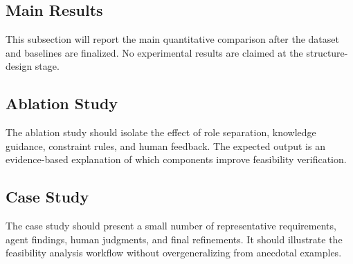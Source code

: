 \subsection{Main Results}
\label{exp:main_results}

This subsection will report the main quantitative comparison after the dataset and baselines are finalized.
No experimental results are claimed at the structure-design stage.

\subsection{Ablation Study}
\label{exp:ablation}

The ablation study should isolate the effect of role separation, knowledge guidance, constraint rules, and human feedback.
The expected output is an evidence-based explanation of which components improve feasibility verification.

\subsection{Case Study}
\label{exp:case_study}

The case study should present a small number of representative requirements, agent findings, human judgments, and final refinements.
It should illustrate the feasibility analysis workflow without overgeneralizing from anecdotal examples.
